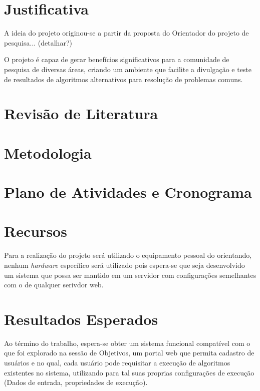 \documentclass[12pt]{article}
\begin{document}
\section{Justificativa}
A ideia do projeto originou-se a partir da proposta do Orientador do projeto de pesquisa... (detalhar?)

O projeto é capaz de gerar benefícios significativos para a comunidade de pesquisa de diversas áreas, criando um ambiente que facilite a divulgação e teste de resultados de algoritmos alternativos para resolução de problemas comuns.

\section{Revisão de Literatura}
\section{Metodologia}
\section{Plano de Atividades e Cronograma}
\section{Recursos}
Para a realização do projeto será utilizado o equipamento pessoal do orientando, nenhum \textit{hardware} específico será utilizado pois espera-se que seja desenvolvido um sistema que possa ser mantido em um servidor com configurações semelhantes com o de qualquer serivdor web.
\section{Resultados Esperados}
Ao término do trabalho, espera-se obter um sistema funcional compatível com o que foi explorado na sessão de Objetivos, um portal web que permita cadastro de usuários e no qual, cada usuário pode requisitar a execução de algoritmos existentes no sistema, utilizando para tal suas proprias configurações de execução (Dados de entrada, propriedades de execução).


\end{document}
